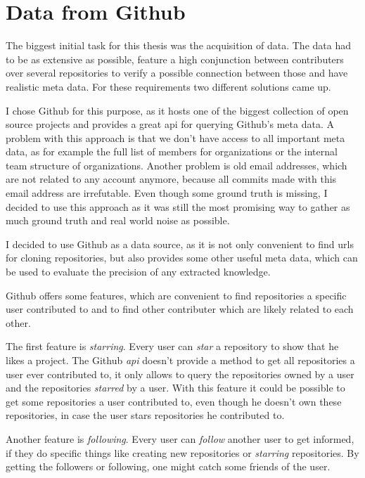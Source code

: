 \chapter{Data from Github}\label{github}
The biggest initial task for this thesis was the acquisition of data.
The data had to be as extensive as possible, feature a high conjunction between contributers over several repositories to verify a possible connection between those and have realistic meta data.
For these requirements two different solutions came up.

I chose Github for this purpose, as it hosts one of the biggest collection of open source projects and provides a great \ac{api} for querying Github's meta data.
A problem with this approach is that we don't have access to all important meta data, as for example the full list of members for organizations or the internal team structure of organizations.
Another problem is old email addresses, which are not related to any account anymore, because all commits made with this email address are irrefutable.
Even though some ground truth is missing, I decided to use this approach as it was still the most promising way to gather as much ground truth and real world noise as possible.

I decided to use Github as a data source, as it is not only convenient to find \acp{url} for cloning repositories, but also provides some other useful meta data, which can be used to evaluate the precision of any extracted knowledge.

Github offers some features, which are convenient to find repositories a specific user contributed to and to find other contributer which are likely related to each other.

The first feature is \emph{starring}. Every user can \emph{star} a repository to show that he likes a project.
The Github \emph{api} doesn't provide a method to get all repositories a user ever contributed to, it only allows to query the repositories owned by a user and the repositories \emph{starred} by a user.
With this feature it could be possible to get some repositories a user contributed to, even though he doesn't own these repositories, in case the user stars repositories he contributed to.

Another feature is \emph{following}. Every user can \emph{follow} another user to get informed, if they do specific things like creating new repositories or \emph{starring} repositories.
By getting the followers or following, one might catch some friends of the user.

